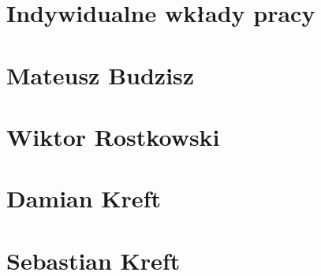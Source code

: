 

\section{Indywidualne wkłady pracy}
\label{sec:indywidualne-wklady-pracy}


\section{Mateusz Budzisz}
\label{sec:mateusz-budzisz}

\section{Wiktor Rostkowski}
\label{sec:wiktor-rostkowski}

\section{Damian Kreft}
\label{sec:damian-kreft}

\section{Sebastian Kreft}
\label{sec:sebastian-kreft}




